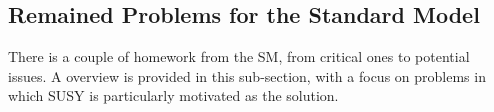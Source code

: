 




%
%
\clearpage
\subsection{Remained Problems for the Standard Model}
There is a couple of homework from the SM, from critical ones to potential issues.
A overview is provided in this sub-section, with a focus on problems in which SUSY is particularly motivated as the solution. \\

